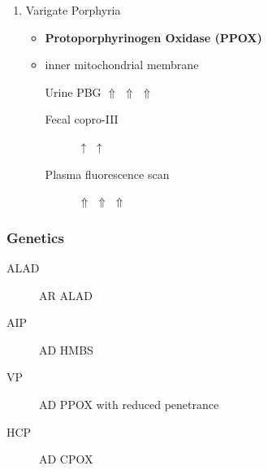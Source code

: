 \documentclass[12pt]{scrartcl}
\begin{document}
\begin{enumerate}
\item Varigate Porphyria
\label{sec:org3d64e10}
\begin{itemize}
\item \textbf{Protoporphyrinogen Oxidase (PPOX)}
\item inner mitochondrial membrane
\item[{Urine PBG}] \(\Uparrow\) \(\Uparrow\) \(\Uparrow\)
\begin{description}
\item[{Fecal copro-III}] \(\uparrow\) \(\uparrow\)
\item[{Plasma fluorescence scan}] \(\Uparrow\) \(\Uparrow\) \(\Uparrow\)
\end{description}
\end{itemize}
\end{enumerate}

\subsubsection{Genetics}
\label{sec:org08cc7cf}
\begin{description}
\item[{ALAD}] AR ALAD
\item[{AIP}] AD HMBS
\item[{VP}] AD PPOX with reduced penetrance
\item[{HCP}] AD CPOX
\end{description}
\end{document}
